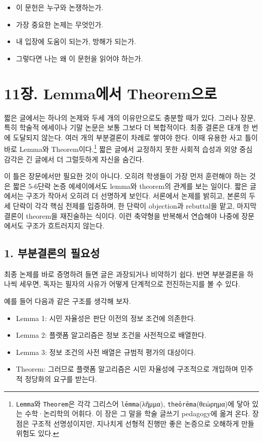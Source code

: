 \begin{itemize}
\tightlist
\item
  이 문헌은 누구와 논쟁하는가.
\item
  가장 중요한 논제는 무엇인가.
\item
  내 입장에 도움이 되는가, 방해가 되는가.
\item
  그렇다면 나는 왜 이 문헌을 읽어야 하는가.
\end{itemize}

\chapter{11장. Lemma에서 Theorem으로}\label{11uxc7a5-lemmauxc5d0uxc11c-theoremuxc73cuxb85c}

짧은 글에서는 하나의 논제와 두세 개의 이유만으로도 충분할 때가 있다. 그러나 장문, 특히 학술적 에세이나 기말 논문은 보통 그보다 더 복합적이다. 최종 결론은 대개 한 번에 도달되지 않는다. 여러 개의 부분결론이 차례로 쌓여야 한다. 이때 유용한 사고 틀이 바로 Lemma와 Theorem이다.\footnote{\texttt{Lemma}와 \texttt{Theorem}은 각각 그리스어 \texttt{lēmma}(λῆμμα), \texttt{theōrēma}(θεώρημα)에 닿아 있는 수학·논리학의 어휘다. 이 장은 그 말을 학술 글쓰기 pedagogy에 옮겨 온다. 장점은 구조적 선명성이지만, 지나치게 선형적 진행만 좋은 논증으로 오해하게 만들 위험도 있다.} 짧은 글에서 교정하지 못한 사회적 습성과 외양 중심 감각은 긴 글에서 더 그럴듯하게 자신을 숨긴다.

이 틀은 장문에서만 필요한 것이 아니다. 오히려 학생들이 가장 먼저 훈련해야 하는 것은 짧은 5-6단락 논증 에세이에서도 lemma와 theorem의 관계를 보는 일이다. 짧은 글에서는 구조가 작아서 오히려 더 선명하게 보인다. 서론에서 논제를 밝히고, 본론의 두세 단락이 각각 핵심 전제를 입증하며, 한 단락이 objection과 rebuttal을 맡고, 마지막 결론이 theorem을 재진술하는 식이다. 이런 축약형을 반복해서 연습해야 나중에 장문에서도 구조가 흐트러지지 않는다.

\section{1. 부분결론의 필요성}\label{1-uxbd80uxbd84uxacb0uxb860uxc758-uxd544uxc694uxc131}

최종 논제를 바로 증명하려 들면 글은 과장되거나 비약하기 쉽다. 반면 부분결론을 하나씩 세우면, 독자는 필자의 사유가 어떻게 단계적으로 전진하는지를 볼 수 있다.

예를 들어 다음과 같은 구조를 생각해 보자.

\begin{itemize}
\tightlist
\item
  Lemma 1: 시민 자율성은 판단 이전의 정보 조건에 의존한다.
\item
  Lemma 2: 플랫폼 알고리즘은 정보 조건을 사전적으로 배열한다.
\item
  Lemma 3: 정보 조건의 사전 배열은 규범적 평가의 대상이다.
\item
  Theorem: 그러므로 플랫폼 알고리즘은 시민 자율성에 구조적으로 개입하며 민주적 정당화의 요구를 받는다.
\end{itemize}

